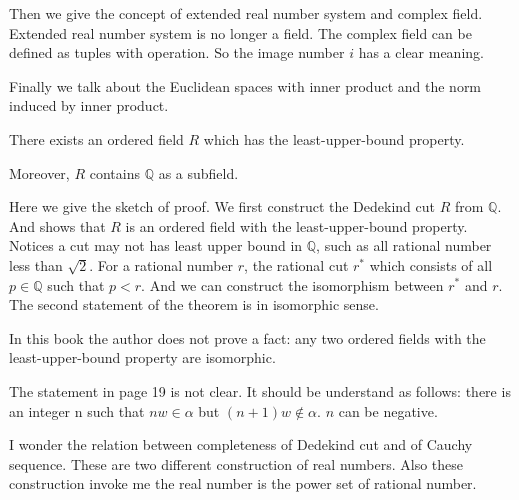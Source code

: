 Then we give the concept of extended real number system and complex field. Extended real number system is no longer a field. The complex field can be defined as tuples with operation. So the image number $i$ has a clear meaning.\par
Finally we talk about the Euclidean spaces with inner product and the norm induced by inner product.\par
\begin{note}[Appendix]
    \begin{theorem}[Theorem 1.19]
        There exists an ordered field $R$ which has the least-upper-bound property.\par
        Moreover, $R$ contains $\mathbb{Q}$ as a subfield.
    \end{theorem}
    Here we give the sketch of proof. We first construct the Dedekind cut $R$ from $\mathbb{Q}$. And shows that $R$ is an ordered field with the least-upper-bound property. Notices a cut may not has least upper bound in $\mathbb{Q}$, such as all rational number less than $\sqrt{2}$. For a rational number $r$, the rational cut $r^*$ which consists of all $p\in \mathbb{Q}$ such that $p<r$. And we can construct the isomorphism between $r^*$ and $r$. The second statement of the theorem is in isomorphic sense.\par
    In this book the author does not prove a fact: any two ordered fields with the least-upper-bound property are isomorphic.
\end{note}
\begin{remark}
    The statement in page 19 is not clear. It should be understand as follows: there is an integer n such that $nw\in \alpha$ but $(n+1)w\notin \alpha$. $n$ can be negative.\par
\end{remark}
\begin{note}
    I wonder the relation between completeness of Dedekind cut and of Cauchy sequence. These are two different construction of real numbers. Also these construction invoke me the real number is the power set of rational number.
\end{note}
